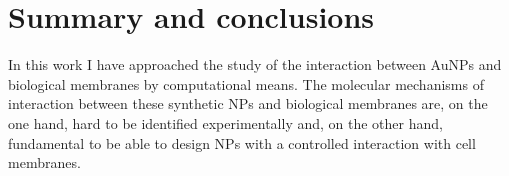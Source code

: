\chapter{Summary and conclusions}
\label{chap:conclusions}

%
%
In this work I have approached the study of the interaction between \acp{AuNP} and biological membranes by computational means. The molecular mechanisms of interaction between these synthetic \acp{NP} and biological membranes are, on the one hand, hard to be identified experimentally and, on the other hand, fundamental to be able to design \acp{NP} with a controlled interaction with cell membranes.
